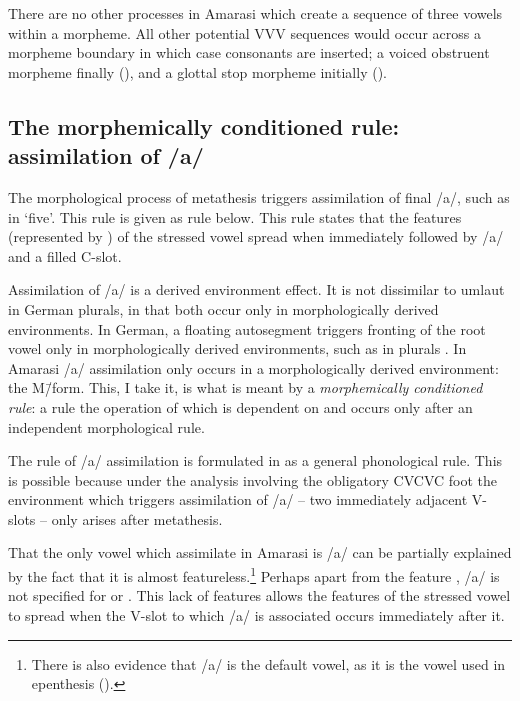 There are no other processes in Amarasi which create a sequence
of three vowels within a morpheme.
All other potential VVV sequences would occur across a morpheme
boundary in which case consonants are inserted;
a voiced obstruent morpheme finally (),
and a glottal stop morpheme initially ().

\subsection{The morphemically conditioned rule: assimilation of /a/}\label{sec:MorRulAssOfA}
The morphological process of metathesis
triggers assimilation of final /a/,
such as in  {\ra}  `five'.
This rule is given as rule  below.
This rule states that the features (represented by \tsc{[+F.]}) of the stressed vowel spread
when immediately followed by /a/ and a filled C-slot.

\begin{exe}
	\label{ex:'VaC->VC}
\end{exe}

Assimilation of /a/ is a derived environment effect.
It is not dissimilar to umlaut in German plurals,
in that both occur only in morphologically derived environments.
In German, a floating autosegment triggers fronting of the root vowel
only in morphologically derived environments,
such as in plurals \citep[181ff]{wi96}.
In Amarasi /a/ assimilation only occurs
in a morphologically derived environment: the M\=/form.
This, I take it, is what is meant by a
\emph{morphemically conditioned rule}:
a rule the operation of which is dependent on
and occurs only after an independent morphological rule.

The rule of /a/ assimilation is formulated 
in  as a general phonological rule.
This is possible because under the analysis involving
the obligatory CVCVC foot the environment which triggers
assimilation of /a/ -- two immediately adjacent V-slots --
only arises after metathesis.

That the only vowel which assimilate in Amarasi is /a/
can be partially explained by the fact that it is almost featureless.\footnote{
		There is also evidence that /a/ is the default vowel,
		as it is the vowel used in epenthesis ().}
Perhaps apart from the feature \tsc{[+low]},
/a/ is not specified for  or .
This lack of features allows the features of the stressed vowel to spread
when the V-slot to which /a/ is associated occurs immediately after it.


